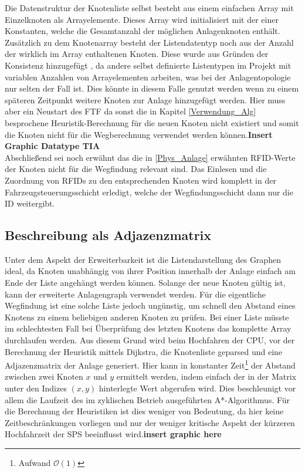 			Die Datenstruktur der Knotenliste selbst besteht aus einem einfachen Array mit Einzelknoten als Arrayelemente. Dieses Array wird initialisiert mit der einer Konstanten, welche die Gesamtanzahl der möglichen Anlagenknoten enthält. Zusätzlich zu dem Knotenarray besteht der Listendatentyp noch aus der Anzahl der wirklich im Array enthaltenen Knoten. Diese wurde aus Gründen der Konsistenz hinzugefügt , da andere selbst definierte Listentypen im Projekt mit variablen Anzahlen von Arrayelementen arbeiten, was bei der Anlagentopologie nur selten der Fall ist. Dies könnte in diesem Falle genutzt werden wenn zu einem späteren Zeitpunkt weitere Knoten zur Anlage hinzugefügt werden. Hier muss aber ein Neustart des \ac{FTF} da sonst die in Kapitel \ref{Verwendung_Alg} besprochene Heuristik-Berechnung für die neuen Knoten nicht existiert und somit die Knoten nicht für die Wegberechnung verwendet werden können.\textbf{Insert Graphic Datatype TIA}\\
			
			Abschließend sei noch erwähnt das die in \ref{Phys_Anlage} erwähnten \ac{RFID}-Werte der Knoten nicht für die Wegfindung relevant sind. Das Einlesen und die Zuordnung von \ac{RFID}s zu den entsprechenden Knoten wird komplett in der Fahrzeugsteuerungsschicht erledigt, welche der Wegfindungsschicht dann nur die ID weitergibt.
			
		\subsection{Beschreibung als Adjazenzmatrix}
			\label{Adjazenzmatrix}
			Unter dem Aspekt der Erweiterbarkeit ist die Listendarstellung des Graphen ideal, da Knoten unabhängig von ihrer Position innerhalb der Anlage einfach am Ende der Liste angehängt werden können. Solange der neue Knoten gültig ist, kann der erweiterte Anlagengraph verwendet werden. Für die eigentliche Wegfindung ist eine solche Liste jedoch ungünstig, um schnell den Abstand eines Knotens zu einem beliebigen anderen Knoten zu prüfen. Bei einer Liste müsste im schlechtesten Fall bei Überprüfung des letzten Knotens das komplette Array durchlaufen werden. Aus diesem Grund wird beim Hochfahren der CPU, vor der Berechnung der Heuristik mittels Dijkstra, die Knotenliste geparsed und eine Adjazenzmatrix der Anlage generiert. Hier kann in konstanter Zeit\footnote{Aufwand $\mathcal{O}(1)$} der Abstand zwischen zwei Knoten $x$ und $y$ ermittelt werden, indem einfach der in der Matrix unter den Indizes $(x,y)$ hinterlegte Wert abgerufen wird. Dies beschleunigt vor allem die Laufzeit des im zyklischen Betrieb ausgeführten A*-Algorithmus. Für die Berechnung der Heuristiken ist dies weniger von Bedeutung, da hier keine Zeitbeschränkungen vorliegen und nur der weniger kritische Aspekt der kürzeren Hochfahrzeit der \ac{SPS} beeinflusst wird.\textbf{insert graphic here}

